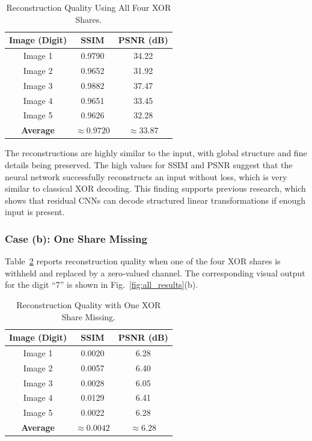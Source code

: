 \begin{table}[htbp]
\centering
\caption{Reconstruction Quality Using All Four XOR Shares.}
\label{tab:xor4}
\begin{tabular}{|c|c|c|}
\hline
\textbf{Image (Digit)} & \textbf{SSIM} & \textbf{PSNR (dB)} \\
\hline
Image 1   & 0.9790 & 34.22 \\
Image 2   & 0.9652 & 31.92 \\
Image 3   & 0.9882 & 37.47 \\
Image 4   & 0.9651 & 33.45 \\
Image 5   & 0.9626 & 32.28 \\
\hline
\textbf{Average} & $\mathbf{\approx 0.9720}$ & $\mathbf{\approx 33.87}$ \\
\hline
\end{tabular}
\end{table}

The reconstructions are highly similar to the input, with global structure and fine details being preserved. The high values for SSIM and PSNR suggest that the neural network successfully reconstructs an input without loss, which is very similar to classical XOR decoding. This finding supports previous research, which shows that residual CNNs can decode structured linear transformations if enough input is present.

\subsubsection{Case (b): One Share Missing}

Table~\ref{tab:xor_miss1} reports reconstruction quality when one of the four
XOR shares is withheld and replaced by a zero-valued channel. The corresponding
visual output for the digit ``7'' is shown in Fig.~\ref{fig:all_results}(b).

\begin{table}[htbp]
\centering
\caption{Reconstruction Quality with One XOR Share Missing.}
\label{tab:xor_miss1}
\begin{tabular}{|c|c|c|}
\hline
\textbf{Image (Digit)} & \textbf{SSIM} & \textbf{PSNR (dB)} \\
\hline
Image 1   & 0.0020  &  6.28 \\
Image 2   & 0.0057  &  6.40 \\
Image 3   & 0.0028  &  6.05 \\
Image 4   & 0.0129  &  6.41 \\
Image 5   & 0.0022 & 6.28 \\
\hline
\textbf{Average} & $\mathbf{\approx 0.0042}$ & $\mathbf{\approx 6.28}$ \\
\hline
\end{tabular}
\end{table}

